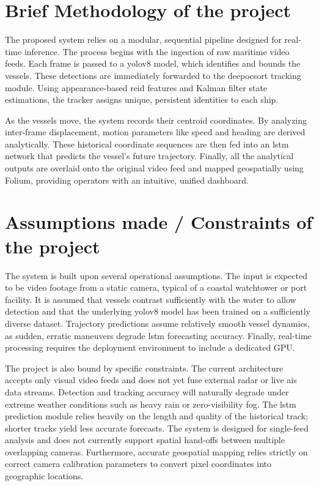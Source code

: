 \section[Brief Methodology of the project]{\textbf{Brief Methodology of the project}}
The proposed system relies on a modular, sequential pipeline designed for real-time inference. The process begins with the ingestion of raw maritime video feeds. Each frame is passed to a \gls{yolov8} model, which identifies and bounds the vessels. These detections are immediately forwarded to the \gls{deepocsort} tracking module. Using appearance-based \gls{reid} features and Kalman filter state estimations, the tracker assigns unique, persistent identities to each ship.

As the vessels move, the system records their centroid coordinates. By analyzing inter-frame displacement, motion parameters like speed and heading are derived analytically. These historical coordinate sequences are then fed into an \gls{lstm} network that predicts the vessel's future trajectory. Finally, all the analytical outputs are overlaid onto the original video feed and mapped geospatially using Folium, providing operators with an intuitive, unified dashboard.

\section[Assumptions made / Constraints of the project]{\textbf{Assumptions made / Constraints of the project}}
The system is built upon several operational assumptions. The input is expected to be video footage from a static camera, typical of a coastal watchtower or port facility. It is assumed that vessels contrast sufficiently with the water to allow detection and that the underlying \gls{yolov8} model has been trained on a sufficiently diverse dataset. Trajectory predictions assume relatively smooth vessel dynamics, as sudden, erratic maneuvers degrade \gls{lstm} forecasting accuracy. Finally, real-time processing requires the deployment environment to include a dedicated GPU.

The project is also bound by specific constraints. The current architecture accepts only visual video feeds and does not yet fuse external radar or live \gls{ais} data streams. Detection and tracking accuracy will naturally degrade under extreme weather conditions such as heavy rain or zero-visibility fog. The \gls{lstm} prediction module relies heavily on the length and quality of the historical track; shorter tracks yield less accurate forecasts. The system is designed for single-feed analysis and does not currently support spatial hand-offs between multiple overlapping cameras. Furthermore, accurate geospatial mapping relies strictly on correct camera calibration parameters to convert pixel coordinates into geographic locations.

